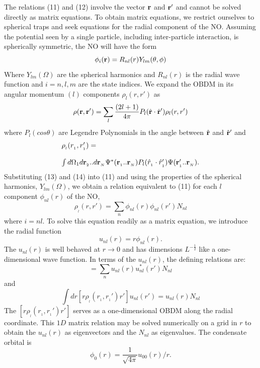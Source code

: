 \documentclass[aps,pra,twocolumn,groupedaddress]{revtex4}
\begin{document}
The relations (11) and (12) involve the vector ${\bf r}$ and ${\bf r}'$
and cannot be solved directly as matrix equations.  To obtain matrix
equations, we restrict ourselves to spherical traps and seek equations for the
radial component of the NO. Assuming the potential seen by a single particle,
including inter-particle interaction, is spherically symmetric, the NO will
have the form 
\begin{equation}
	\phi_i({\bf r}) = R_{nl}(r)Y_{lm}(\theta,\phi)
\end{equation}
Where $Y_{lm}(\Omega)$ are the spherical harmonics and $R_{nl}(r)$ is the
radial wave function and $i=n,l,m$ are the state indices.
We expand the OBDM in its angular momentum $(l)$ components $\rho_l(r,r')$
as
\begin{equation}
\rho({\bf r},{\bf r}') = \sum_l \frac{(2l+1)}{4\pi}P_l(\hat{\bf r}
\cdot\hat{\bf r}')
\rho_l(r,r')
\end{equation}
where $P_l(cos\theta)$ are Legendre Polynomials in the angle between
$\hat{\bf r}$ and $\hat{\bf r}'$ and
%
\begin{equation}
\begin{array}{l}
\rho_{_l}(r_{_1},r_{_1}') =\\
\\
        \int{
                d\Omega_1d{\bf r}_{_2}..d{\bf r}_{_N}
                \Psi^{*}({\bf r}_{_1}..{\bf r}_{_N})
                P_l(\hat{r}_{_1}\cdot\hat{r}'_{_1})
                \Psi({\bf r}'_{_1}..{\bf r}_{_N})
        }.
\end{array}
\end{equation}
Substituting (13) and (14) into (11) and using the properties of the
spherical harmonics,
$Y_{lm}(\Omega)$, we obtain a relation equivalent to (11) for each
$l$ component $\phi_{nl}(r)$ of the NO,
\begin{equation}
\rho_{_l}(r,r') = \sum_n \phi_{nl}(r)\phi_{nl}(r')N_{nl}
\end{equation}
where $i=nl$.  To solve this equation readily as a matrix equation, we
introduce the radial function
\begin{equation}
u_{nl}(r) = r\phi_{nl}(r).
\end{equation}
The $u_{nl}(r)$ is well behaved at $r \rightarrow 0$ and has dimensions
$L^{-\frac{1}{2}}$ like a one-dimensional wave function.  
In terms of the $u_{nl}(r)$,
the defining relations are:
\begin{equation}
[r\rho_{_l}(r_{_1},r_{_1}')r'] = \sum_n u_{nl}(r)u_{nl}^{*}(r')N_{nl}
\end{equation}
and
\begin{equation}
\int dr [r\rho_{_l}(r_{_1},r_{_1}')r'] u_{nl}(r') = u_{nl}(r)N_{nl}
\end{equation}
The $[r\rho_{_l}(r_{_1},r_{_1}')r']$ serves as a one-dimensional OBDM along the radial
coordinate.  This $1D$ matrix relation may be solved numerically on a grid
in $r$ to obtain the $u_{nl}(r)$ as eigenvectors and the $N_{nl}$ as
eigenvalues.  The condensate orbital is 
\begin{equation}
	\phi_0(r) = \frac{1}{\sqrt{4\pi}}u_{00}(r)/r.
\end{equation}
\end{document}
